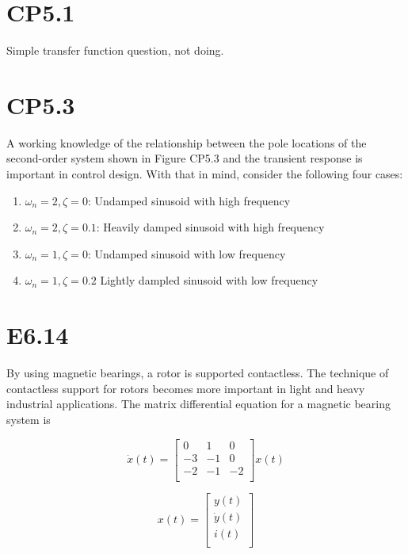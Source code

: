 \documentclass[11pt]{article}
\begin{document}
\section{CP5.1}

Simple transfer function question, not doing.

\section{CP5.3}

A working knowledge of the relationship between the pole locations of the second-order system shown in Figure CP5.3 and the transient response is important in control design. With that in mind, consider the following four cases:

\begin{enumerate}
    \item $\omega_n = 2, \zeta = 0$: Undamped sinusoid with high frequency
    \item $\omega_n = 2, \zeta = 0.1$: Heavily damped sinusoid with high frequency
    \item $\omega_n = 1, \zeta = 0$: Undamped sinusoid with low frequency
    \item $\omega_n = 1, \zeta = 0.2$ Lightly dampled sinusoid with low frequency
\end{enumerate}

\section{E6.14}

By using magnetic bearings, a rotor is supported contactless. The technique of contactless support for rotors becomes more important in light and heavy industrial applications. The matrix differential equation for a magnetic bearing system is

\[
    \dot x(t) =
    \begin{bmatrix}
        0 & 1 & 0 \\
        -3 & -1 & 0 \\
        -2 & -1 & -2 \\
    \end{bmatrix}
    x(t)
\]

\[
    x(t) =
    \begin{bmatrix}
        y(t) \\
        \dot y(t) \\
        i(t) \\
    \end{bmatrix}
\]
\end{document}
